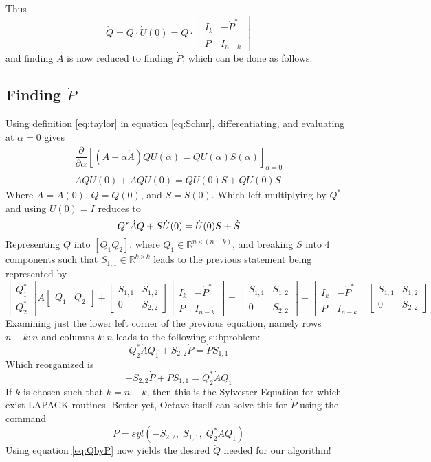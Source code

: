 \documentclass[fleqn,12pt]{article}
\newcommand{\bmatTt}[2]{\begin{bmatrix} #1 \\ #2 \end{bmatrix}}
\newcommand{\bmatTw}[2]{\begin{bmatrix} #1 & #2 \end{bmatrix}}
\newcommand{\bmatF}[4]{\begin{bmatrix} #1 & #2\\ #3 & #4 \end{bmatrix}}
\begin{document}
Thus
\begin{equation}\label{eq:QbyP}
  \dot{Q} = Q \cdot \dot{U}(0) = Q \cdot \begin{bmatrix}
    I_k & - \dot{P}^*\\
    \dot{P} & I_{n-k}
  \end{bmatrix}
\end{equation}
and finding $\dot{A}$ is now reduced to finding $\dot{P}$, which can be done as follows.

\subsection{Finding $\dot{P}$}

Using definition \ref{eq:taylor} in equation \ref{eq:Schur}, differentiating, and evaluating at $\alpha = 0$ gives
\begin{gather}
  \dfrac{\partial}{\partial \alpha} 
  \left[ 
    (A + \alpha \dot{A}) Q U(\alpha) = Q U(\alpha) S(\alpha)  
  \right]_{\alpha = 0}\\
  \dot{A} Q U(0) + A Q \dot{U}(0) = Q \dot{U}(0) S + Q U(0) \dot{S}
\end{gather}
Where $A = A(0)$, $Q = Q(0)$, and $S = S(0)$.
Which left multiplying by $Q^*$ and using $U(0) = I$ reduces to
\begin{equation}
  Q^* \dot{A} Q + S \dot{U}(0) = \dot{U}(0) S + \dot{S}\\
\end{equation}
Representing $Q$ into $[ Q_1 Q_2]$, where $Q_1 \in \mathbb{R}^{n \times (n-k)}$,
and breaking $S$ into 4 components such that $S_{1,1} \in \mathbb{R}^{k \times k}$ leads
to the previous statement being represented by
\begin{equation}
  \bmatTt{Q_1^*}{Q_2^*} \dot{A} \bmatTw{Q_1}{Q_2} + 
  \bmatF{S_{1,1}}{S_{1,2}}{0}{S_{2,2}} \bmatF{I_k}{-\dot{P}^*}{\dot{P}}{I_{n-k}} = 
  \bmatF{\dot{S}_{1,1}}{\dot{S}_{1,2}}{0}{\dot{S}_{2,2}} + 
  \bmatF{I_k}{-\dot{P}^*}{\dot{P}}{I_{n-k}} \bmatF{S_{1,1}}{S_{1,2}}{0}{S_{2,2}}
\end{equation}
Examining just the lower left corner of the previous equation, namely rows $n-k : n$ and columns $k:n$
leads to the following subproblem:
\begin{equation}
  Q_2^* \dot{A} Q_1 + S_{2,2} \dot{P} = \dot{P} S_{1,1}
\end{equation}
Which reorganized is
\begin{equation}
  -S_{2,2} \dot{P} + \dot{P} S_{1,1} = Q_2^* \dot{A} Q_1
\end{equation}
If $k$ is chosen such that $k = n - k$, then this is the Sylvester Equation for which exist LAPACK routines.
Better yet, Octave itself can solve this for $\dot{P}$ using the command
\begin{equation}
  \dot{P} = syl \left( -S_{2,2} , \; S_{1,1} , \; Q_2^* \dot{A} Q_1 \right)
\end{equation}
Using equation \ref{eq:QbyP} now yields the desired $\dot{Q}$ needed for our algorithm!
\end{document}
